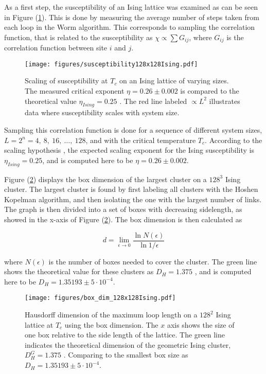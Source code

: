 As a first step, the susceptibility of an Ising lattice was examined as can be seen in Figure (\ref{fig:results_isingsusc}). This is done by measuring the average number of steps taken from each loop in the Worm algorithm. This corresponds to sampling the correlation function, that is related to the susceptibility as $\chi \propto \sum G_{ij}$, where $G_{ij}$ is the correlation function between site $i$ and $j$.


\begin{figure}[h!]
    \centering
        \texttt{[image: figures/susceptibility128x128Ising.pdf]}
    \caption{Scaling of susceptibility at $T_c$ on an Ising lattice of varying sizes. The measured critical exponent $\eta = 0.26 \pm 0.002$ is compared to the theoretical value $\eta_{Ising} = 0.25$ \cite{Plischke:EqStatMech}. The red line labeled $\propto L^2$ illustrates data where susceptibility scales with system size.}
    \label{fig:results_isingsusc}
\end{figure}


\noindent Sampling this correlation function is done for a sequence of different system sizes, $L = 2^n = 4, \ 8, \ 16, \ \ldots, \ 128$, and with the critical temperature $T_c$. According to the scaling hypothesis \cite{Plischke:EqStatMech}, the expected scaling exponent for the Ising susceptibility is $\eta_{Ising} = 0.25$, and is computed here to be $\eta = 0.26 \pm 0.002$.

Figure (\ref{fig:results_boxdimension}) displays the box dimension of the largest cluster on a $128^3$ Ising cluster. The largest cluster is found by first labeling all clusters with the Hoshen Kopelman algorithm, and then isolating the one with the largest number of links. The graph is then divided into a set of boxes with decreasing sidelength, as showed in the x-axis of Figure (\ref{fig:results_boxdimension}). The box dimension is then calculated as

\begin{equation}
    d = \lim_{\epsilon \to 0} \frac{\ln N(\epsilon)}{\ln 1 / \epsilon}
\end{equation}

where $N(\epsilon)$ is the number of boxes needed to cover the cluster. The green line shows the theoretical value for these clusters as $D_H = 1.375$ \cite{Duplantier:GeoHausdorff}, and is computed here to be $D_H = 1.35193 \pm 5 \cdot 10^{-4}$.

\begin{figure}[h!]
    \centering
        \texttt{[image: figures/box\_dim\_128x128Ising.pdf]}
    \caption{Hausdorff dimension of the maximum loop length on a $128^2$ Ising lattice at $T_c$ using the box dimension. The $x$ axis shows the size of one box relative to the side length of the lattice. The green line indicates the theoretical dimension of the geometric Ising cluster, $D_H^G = 1.375$ \cite{Duplantier:GeoHausdorff}. Comparing to the smallest box size as $D_H = 1.35193 \pm 5 \cdot 10^{-4}$.}
    \label{fig:results_boxdimension}
\end{figure}

